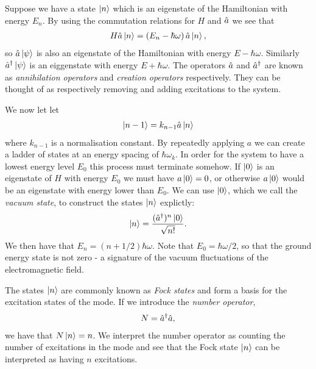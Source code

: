 Suppose we have a state $\left\vert n\right\rangle$ which is an eigenstate of the Hamiltonian with energy $E_n$. By using the commutation relations for $H$ and $\hat{a}$ we see that
\begin{align}
  H\hat{a}\left\vert n\right\rangle = \left(E_n - \hbar \omega\right) \hat{a}\left\vert n\right\rangle,
\end{align}
so $\hat{a}\left\vert\psi\right\rangle$ is also an eigenstate of the Hamiltonian with energy $E - \hbar\omega$. Similarly $\hat{a}^\dagger\left\vert\psi\right\rangle$ is an eiggenstate with energy $E + \hbar\omega$. The operators $\hat{a}$ and $\hat{a}^\dagger$ are known as \textit{annihilation operators} and \textit{creation operators} respectively. They can be thought of as respectively removing and adding excitations to the system. 

We now let let 
\begin{align}
  \left\vert n-1\right\rangle = k_{n-1}\hat{a} \left\vert n\right\rangle
\end{align}
where $k_{n-1}$ is a normalisation constant. By repeatedly applying $a$ we can create a ladder of states at an energy spacing of $\hbar\omega_k$. In order for the system to have a lowest energy level $E_0$ this process must terminate somehow. If $\left\vert0\right\rangle$ is an eigenstate of $H$ with energy $E_0$ we must have $a\left\vert0\right\rangle = 0$, or otherwise $a\left\vert0\right\rangle$ would be an eigenstate with energy lower than $E_0$. We can use $\left\vert0\right\rangle$, which we call the \textit{vacuum state}, to construct the states $\left\vert n\right\rangle$ explictly:
\begin{align}
  \left\vert n\right\rangle = \frac{(\hat{a}^\dagger)^n \left\vert0\right\rangle}{\sqrt{n!}}. 
\end{align}
We then have that $E_n = (n+1/2)\hbar\omega$. Note that $E_0 =\hbar \omega/2$, so that the ground energy state is not zero - a signature of the vacuum fluctuations of the electromagnetic field.

The states $\left\vert n\right\rangle$ are commonly known as \textit{Fock states} and form a basis for the excitation states of the mode. If we introduce the \textit{number operator},
\begin{align}
  N = \hat{a}^\dagger\hat{a},
\end{align}
we have that $N\left\vert n\right\rangle = n$.  We interpret the number operator as counting the number of excitations in the mode and see that the Fock state $\left\vert n\right\rangle$ can be interpreted as having $n$ excitations.

